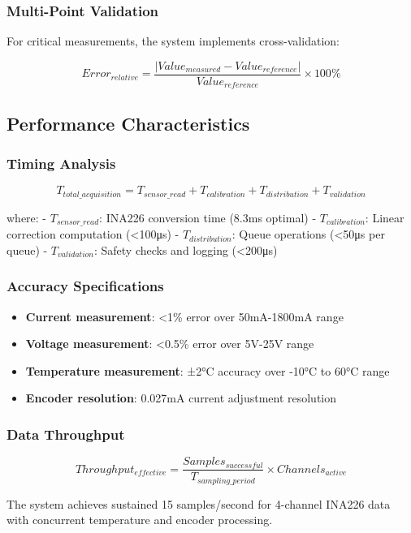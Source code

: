 \documentclass{article}
\begin{document}
\subsubsection{Multi-Point Validation}

For critical measurements, the system implements cross-validation:

\begin{equation}
Error_{relative} = \frac{|Value_{measured} - Value_{reference}|}{Value_{reference}} \times 100\%
\end{equation}

\subsection{Performance Characteristics}

\subsubsection{Timing Analysis}

\begin{equation}
T_{total\_acquisition} = T_{sensor\_read} + T_{calibration} + T_{distribution} + T_{validation}
\end{equation}

where:
- $T_{sensor\_read}$: INA226 conversion time (8.3ms optimal)
- $T_{calibration}$: Linear correction computation (<100μs)
- $T_{distribution}$: Queue operations (<50μs per queue)
- $T_{validation}$: Safety checks and logging (<200μs)

\subsubsection{Accuracy Specifications}

\begin{itemize}
    \item \textbf{Current measurement}: <1\% error over 50mA-1800mA range
    \item \textbf{Voltage measurement}: <0.5\% error over 5V-25V range  
    \item \textbf{Temperature measurement}: ±2°C accuracy over -10°C to 60°C range
    \item \textbf{Encoder resolution}: 0.027mA current adjustment resolution
\end{itemize}

\subsubsection{Data Throughput}

\begin{equation}
Throughput_{effective} = \frac{Samples_{successful}}{T_{sampling\_period}} \times Channels_{active}
\end{equation}

The system achieves sustained 15 samples/second for 4-channel INA226 data with concurrent temperature and encoder processing.
\end{document}
